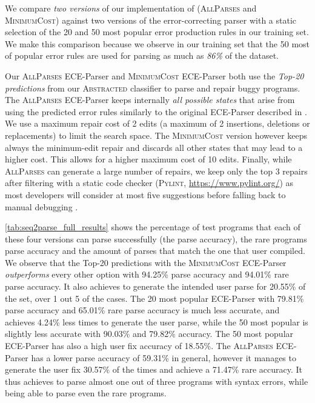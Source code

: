 We compare \emph{two versions} of our implementation of \toolname
(\textsc{AllParses} and \textsc{MinimumCost}) against two versions of the
error-correcting parser with a static selection of the 20 and 50 most popular
error production rules in our training set. We make this comparison because we
observe in our training set that the 50 most of popular error rules are used for
parsing as much as \emph{86\%} of the dataset.

Our \textsc{AllParses} ECE-Parser and \textsc{MinimumCost} ECE-Parser both use
the \emph{Top-20 predictions} from our \textsc{Abstracted} classifier to parse
and repair buggy programs. The \textsc{AllParses} ECE-Parser keeps internally
\emph{all possible states} that arise from using the predicted error rules
similarly to the original ECE-Parser described in \citep{Aho_1972}. We use a
maximum repair cost of 2 edits (\ie a maximum of 2 insertions, deletions or
replacements) to limit the search space. The \textsc{MinimumCost} version
however keeps always the minimum-edit repair and discards all other states that
may lead to a higher cost. This allows for a higher maximum cost of 10 edits.
Finally, while \textsc{AllParses} can generate a large number of repairs, we
keep only the top 3 repairs after filtering with a static code checker
(\textsc{Pylint}, \url{https://www.pylint.org/}) as most developers will
consider at most five suggestions before falling back to manual debugging
\citep{Kochhar2016-oc, Parnin2011-ce}.

\autoref{tab:seq2parse_full_results} shows the percentage of test programs that
each of these four versions can parse successfully (\ie the parse accuracy), the
rare programs parse accuracy and the amount of parses that match the one that
user compiled. We observe that the Top-20 predictions with the
\textsc{MinimumCost} ECE-Parser \emph{outperforms} every other option with
94.25\% parse accuracy and 94.01\% rare parse accuracy. It also achieves to
generate the intended user parse for 20.55\% of the set, \ie over 1 out 5 of the
cases. The 20 most popular ECE-Parser with 79.81\% parse accuracy and 65.01\%
rare parse accuracy is much less accurate, and achieves 4.24\% less times to
generate the user parse, while the 50 most popular is slightly less accurate
with 90.03\% and 79.82\% accuracy. The 50 most popular ECE-Parser has also a
high user fix accuracy of 18.55\%. The \textsc{AllParses} ECE-Parser has a lower
parse accuracy of 59.31\% in general, however it manages to generate the user
fix 30.57\% of the times and achieve a 71.47\% rare accuracy. It thus achieves
to parse almost one out of three programs with syntax errors, while being able
to parse even the rare programs.

